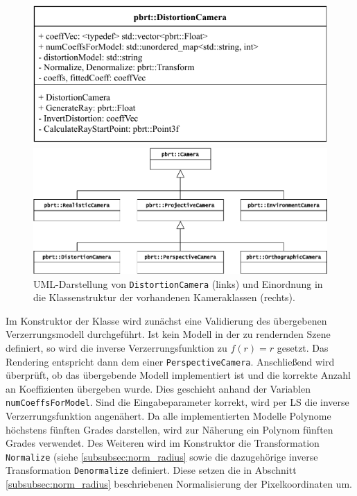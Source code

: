 \begin{figure}[h]
	\begin{minipage}{.5\textwidth}
		\centering
		\includegraphics[height=.4\columnwidth]{uml_distortioncam}
	\end{minipage}
	\begin{minipage}{.5\textwidth}
		\centering
		\includegraphics[height=.4\columnwidth]{uml_classes}
	\end{minipage}
	\caption{UML-Darstellung von \texttt{DistortionCamera} (links) und Einordnung in die Klassenstruktur der vorhandenen Kameraklassen (rechts).}
	\label{fig:uml}
\end{figure}


Im Konstruktor der Klasse wird zunächst eine Validierung des übergebenen Verzerrungsmodell durchgeführt. Ist kein Modell in der zu rendernden Szene definiert, so wird die inverse Verzerrungsfunktion zu $f(r) = r$ gesetzt. Das Rendering entspricht dann dem einer \texttt{PerspectiveCamera}. Anschließend wird überprüft, ob das übergebende Modell implementiert ist und die korrekte Anzahl an Koeffizienten übergeben wurde. Dies geschieht anhand der Variablen \texttt{numCoeffsForModel}. Sind die Eingabeparameter korrekt, wird per LS die inverse Verzerrungsfunktion angenähert. Da alle implementierten Modelle Polynome höchstens fünften Grades darstellen, wird zur Näherung ein Polynom fünften Grades verwendet. 
Des Weiteren wird im Konstruktor die Transformation \texttt{Normalize} (siehe \ref{subsubsec:norm_radius} sowie die dazugehörige inverse Transformation \texttt{Denormalize} definiert. Diese setzen die in Abschnitt \ref{subsubsec:norm_radius} beschriebenen Normalisierung der Pixelkoordinaten um.

